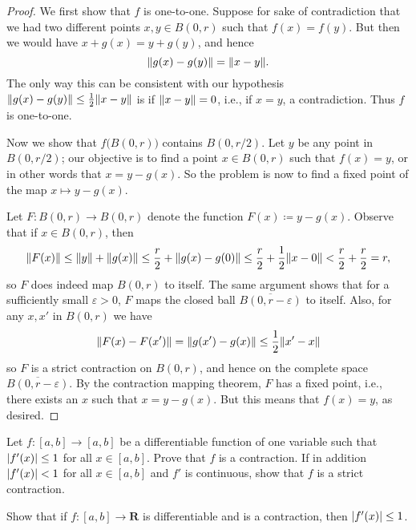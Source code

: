 \begin{proof}
    We first show that \(f\) is one-to-one.
    Suppose for sake of contradiction that we had two different points \(x, y \in B(0, r)\) such that \(f(x) = f(y)\).
    But then we would have \(x + g(x) = y + g(y)\), and hence
    \[
        \norm*{g(x) - g(y)} = \norm*{x - y}.
    \]
    The only way this can be consistent with our hypothesis \(\norm*{g(x) - g(y)} \leq \frac{1}{2} \norm*{x - y}\) is if \(\norm*{x - y} = 0\), i.e., if \(x = y\), a contradiction.
    Thus \(f\) is one-to-one.

    Now we show that \(f\big(B(0, r)\big)\) contains \(B(0, r / 2)\).
    Let \(y\) be any point in \(B(0, r / 2)\);
    our objective is to find a point \(x \in B(0, r)\) such that \(f(x) = y\), or in other words that \(x = y - g(x)\).
    So the problem is now to find a fixed point of the map \(x \mapsto y - g(x)\).

    Let \(F : B(0, r) \to B(0, r)\) denote the function \(F(x) \coloneqq y - g(x)\).
    Observe that if \(x \in B(0, r)\), then
    \[
        \norm*{F(x)} \leq \norm*{y} + \norm*{g(x)} \leq \frac{r}{2} + \norm*{g(x) - g(0)} \leq \frac{r}{2} + \frac{1}{2} \norm*{x - 0} < \frac{r}{2} + \frac{r}{2} = r,
    \]
    so \(F\) does indeed map \(B(0, r)\) to itself.
    The same argument shows that for a sufficiently small \(\varepsilon > 0\), \(F\) maps the closed ball \(\overline{B(0, r - \varepsilon)}\) to itself.
    Also, for any \(x, x'\) in \(B(0, r)\) we have
    \[
        \norm*{F(x) - F(x')} = \norm*{g(x') - g(x)} \leq \frac{1}{2} \norm*{x' - x}
    \]
    so \(F\) is a strict contraction on \(B(0, r)\), and hence on the complete space \(\overline{B(0, r - \varepsilon)}\).
    By the contraction mapping theorem, \(F\) has a fixed point, i.e., there exists an \(x\) such that \(x = y - g(x)\).
    But this means that \(f(x) = y\), as desired.
\end{proof}

\exercisesection

\begin{exercise}\label{ex 6.6.1}
    Let \(f : [a, b] \to [a, b]\) be a differentiable function of one variable such that \(\abs*{f'(x)} \leq 1\) for all \(x \in [a, b]\).
    Prove that \(f\) is a contraction.
    If in addition \(\abs*{f'(x)} < 1\) for all \(x \in [a, b]\) and \(f'\) is continuous, show that \(f\) is a strict contraction.
\end{exercise}

\begin{exercise}\label{ex 6.6.2}
    Show that if \(f : [a, b] \to \mathbf{R}\) is differentiable and is a contraction, then \(\abs*{f'(x)} \leq 1\).
\end{exercise}


